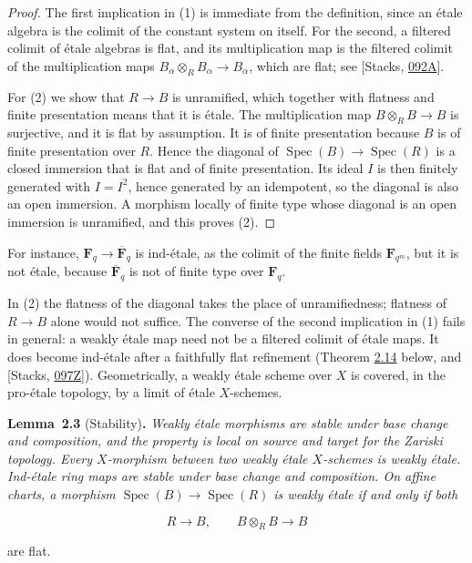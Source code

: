 \documentclass[11pt]{article}
\newenvironment{bpstatement}[2]{\par\addvspace{0.6\baselineskip}\noindent\textbf{#1}#2\textbf{.}\enspace\ignorespaces}
  {\par\addvspace{0.4\baselineskip}}
\newenvironment{bpstatementit}[2]{\begin{bpstatement}{#1}{#2}\itshape\ignorespaces}{\end{bpstatement}}
\begin{document}
\begin{proof}[{Proof}]\label{bp10}%
The first implication in (1) is immediate from the definition, since an étale algebra is the colimit of the constant system on itself. For the second, a filtered colimit of étale algebras is flat, and its multiplication map is the filtered colimit of the multiplication maps \(B_\alpha\otimes_RB_\alpha\to B_\alpha\), which are flat; see [Stacks, \href{https://stacks.math.columbia.edu/tag/092A}{092A}].

For (2) we show that \(R\to B\) is unramified, which together with flatness and finite presentation means that it is étale. The multiplication map \(B\otimes_RB\to B\) is surjective, and it is flat by assumption. It is of finite presentation because \(B\) is of finite presentation over \(R\). Hence the diagonal of \(\operatorname{Spec}(B)\to\operatorname{Spec}(R)\) is a closed immersion that is flat and of finite presentation. Its ideal \(I\) is then finitely generated with \(I=I^2\), hence generated by an idempotent, so the diagonal is also an open immersion. A morphism locally of finite type whose diagonal is an open immersion is unramified, and this proves (2).
\end{proof}

\label{bp11}%
For instance, \(\mathbf F_q\to\overline{\mathbf F}_q\) is ind-étale, as the colimit of the finite fields \(\mathbf F_{q^m}\), but it is not étale, because \(\overline{\mathbf F}_q\) is not of finite type over \(\mathbf F_q\).

In (2) the flatness of the diagonal takes the place of unramifiedness; flatness of \(R\to B\) alone would not suffice. The converse of the second implication in (1) fails in general: a weakly étale map need not be a filtered colimit of étale maps. It does become ind-étale after a faithfully flat refinement (Theorem \hyperref[bp42]{2.14} below, and [Stacks, \href{https://stacks.math.columbia.edu/tag/097Z}{097Z}]). Geometrically, a weakly étale scheme over \(X\) is covered, in the pro-étale topology, by a limit of étale \(X\)-schemes.

\label{bp12}%
\begin{bpstatementit}{Lemma~2.3}{ (Stability)}
Weakly étale morphisms are stable under base change and composition, and the property is local on source and target for the Zariski topology. Every \(X\)-morphism between two weakly étale \(X\)-schemes is weakly étale. Ind-étale ring maps are stable under base change and composition. On affine charts, a morphism \(\operatorname{Spec}(B)\to\operatorname{Spec}(R)\) is weakly étale if and only if both

\[
R\longrightarrow B,
\qquad B\otimes_RB\longrightarrow B
\]

are flat.
\end{bpstatementit}
\end{document}
